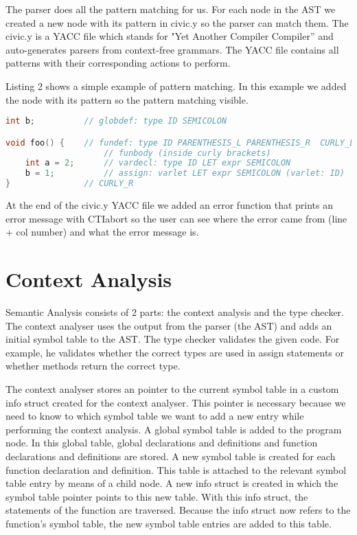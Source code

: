 \documentclass[hidelinks]{uva-inf-article}
\begin{document}
The parser does all the pattern matching for us. For each node in the AST we created 
a new node with its pattern in civic.y so the parser can match them. The civic.y is a
YACC file which stands for "Yet Another Compiler Compiler” and auto-generates parsers
from context-free grammars. The YACC file contains all patterns with their corresponding
actions to perform.

Listing 2 shows a simple example of pattern matching. In this example we added the
node with its pattern so the pattern matching visible. 

\begin{lstlisting}[basicstyle=\small, language=C, label=lst:code-2, caption=Pattern matching Example, captionpos=b]
int b;          // globdef: type ID SEMICOLON

void foo() {    // fundef: type ID PARENTHESIS_L PARENTHESIS_R  CURLY_L
                    // funbody (inside curly brackets)
    int a = 2;      // vardecl: type ID LET expr SEMICOLON
    b = 1;          // assign: varlet LET expr SEMICOLON (varlet: ID)
}               // CURLY_R 
\end{lstlisting}

At the end of the civic.y YACC file we added an error function that prints an error message
with CTIabort so the user can see where the error came from (line + col number) and what
the error message is. 

\section{Context Analysis}
Semantic Analysis consists of 2 parts: the context analysis and the type checker. The context
analyser uses the output from the parser (the AST) and adds an initial symbol table to the AST.
The type checker validates the given code. For example, he validates whether the correct 
types are used in assign statements or whether methods return the correct type.

The context analyser stores an pointer to the current symbol table in a custom info struct created for the context analyser.
This pointer is necessary because we need to know to which symbol table we want to add a new entry while performing the context analysis.
A global symbol table is added to the program node.
In this global table, global declarations and definitions and function declarations and definitions are stored.
A new symbol table is created for each function declaration and definition. 
This table is attached to the relevant symbol table entry by means of a child node.
A new info struct is created in which the symbol table pointer points to this new table. 
With this info struct, the statements of the function are traversed. 
Because the info struct now refers to the function's symbol table, the new symbol table entries are added to this table.
\end{document}
